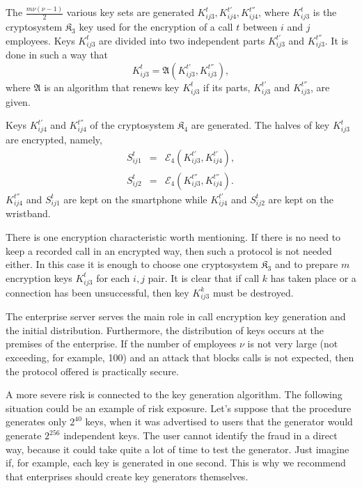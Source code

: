 \documentclass{bjmc}
\begin{document}
 The $\frac{m\nu(\nu-1)}{2}$ various key sets are generated $K_{ij3}^t,  K^{t'}_{ij4}, K^{t''}_{ij4}$, 
where $K_{ij3}^t$ is the cryptosystem
$\mathfrak{K}_3$ key used for the encryption of a call $t$ between $i$ and $j$ employees. Keys $K^t_{ij3}$ are divided into two independent parts $K^{t'}_{ij3}$ and $K^{t''}_{ij3}$.
 It is done in such a way that  
\[
K^t_{ij3}=\mathfrak{A}(K^{t'}_{ij3},K^{t''}_{ij3}),
\]
 where $\mathfrak{A}$ is an algorithm that renews key $K^t_{ij3}$ if its parts, $K^{t'}_{ij3}$ and $K^{t''}_{ij3}$, are given.

Keys $K_{ij4}^{t'}$ and $K_{ij4}^{t''}$ of the cryptosystem $\mathfrak{K}_4$ are generated. The halves of key $K_{ij3}^t$ are encrypted, namely,
\begin{eqnarray*}
S_{ij1}^t&=&\mathcal{E}_4(K_{ij3}^{t'},K_{ij4}^{t'}),\\
S_{ij2}^t&=&\mathcal{E}_4(K_{ij3}^{t''},K_{ij4}^{t''}).
\end{eqnarray*}
$ K_{ij4}^{t''}$ and  $S^t_{ij1}$ are kept on the smartphone while $ K^{t'}_{ij4}$ and  $S^t_{ij2}$ are kept on the wristband.

There is one encryption characteristic worth mentioning. If there is no need to keep a recorded call in an encrypted way, then such a protocol is not needed either. In this case it is enough
 to choose one cryptosystem $\mathfrak{K}_3$ and to prepare $m$ encryption keys  $K^t_{ij3}$ for each $i,j$ pair. It is clear that if  call $k$ has taken place or a connection has been 
unsuccessful, then key $K^k_{ij3}$ must be destroyed.

The enterprise server serves the main role in call encryption key generation and the initial distribution. Furthermore, the distribution of keys occurs at the premises of the enterprise. 
If the number 
of employees $\nu$ is not very large (not exceeding, for example, 100) and an attack that blocks calls is not expected, then the protocol offered is practically secure.

A more severe risk is connected to the key generation algorithm. The following situation could be an example of risk exposure. Let's suppose that the procedure generates only 
$2^{40}$ keys, when it was advertised to users that the generator would generate $2^{256}$ independent keys. The user cannot identify the fraud in a direct way, because it could take 
quite a lot of time to test the generator. Just imagine if, for example, each key is generated in one second. This is why we recommend that enterprises should create key generators themselves.
\end{document}
